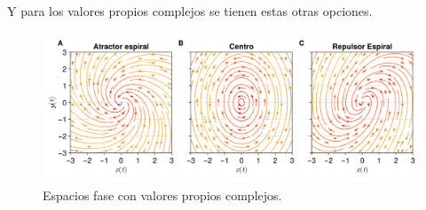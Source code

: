 Y para los valores propios complejos se tienen estas otras opciones.
\begin{figure}[h!]
	\centering
	\includegraphics[scale=0.23]{../Imagenes/Espacios fase complejos}
	\caption{Espacios fase con valores propios complejos.}
	\label{fig:EFComplejos}
\end{figure}

